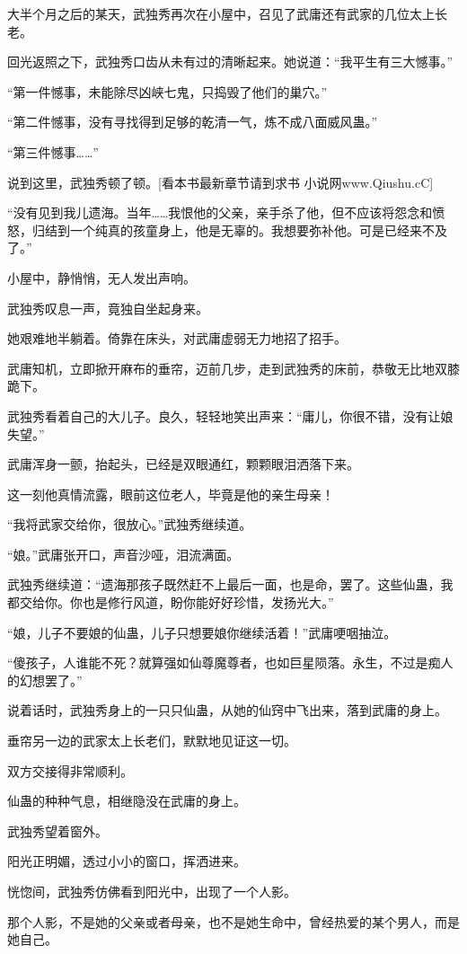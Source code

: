 \begin{this_body}
大半个月之后的某天，武独秀再次在小屋中，召见了武庸还有武家的几位太上长老。

回光返照之下，武独秀口齿从未有过的清晰起来。她说道：“我平生有三大憾事。”

“第一件憾事，未能除尽凶峡七鬼，只捣毁了他们的巢穴。”

“第二件憾事，没有寻找得到足够的乾清一气，炼不成八面威风蛊。”

“第三件憾事……”

说到这里，武独秀顿了顿。[看本书最新章节请到求书 小说网www.Qiushu.cC]

“没有见到我儿遗海。当年……我恨他的父亲，亲手杀了他，但不应该将怨念和愤怒，归结到一个纯真的孩童身上，他是无辜的。我想要弥补他。可是已经来不及了。”

小屋中，静悄悄，无人发出声响。

武独秀叹息一声，竟独自坐起身来。

她艰难地半躺着。倚靠在床头，对武庸虚弱无力地招了招手。

武庸知机，立即掀开麻布的垂帘，迈前几步，走到武独秀的床前，恭敬无比地双膝跪下。

武独秀看着自己的大儿子。良久，轻轻地笑出声来：“庸儿，你很不错，没有让娘失望。”

武庸浑身一颤，抬起头，已经是双眼通红，颗颗眼泪洒落下来。

这一刻他真情流露，眼前这位老人，毕竟是他的亲生母亲！

“我将武家交给你，很放心。”武独秀继续道。

“娘。”武庸张开口，声音沙哑，泪流满面。

武独秀继续道：“遗海那孩子既然赶不上最后一面，也是命，罢了。这些仙蛊，我都交给你。你也是修行风道，盼你能好好珍惜，发扬光大。”

“娘，儿子不要娘的仙蛊，儿子只想要娘你继续活着！”武庸哽咽抽泣。

“傻孩子，人谁能不死？就算强如仙尊魔尊者，也如巨星陨落。永生，不过是痴人的幻想罢了。”

说着话时，武独秀身上的一只只仙蛊，从她的仙窍中飞出来，落到武庸的身上。

垂帘另一边的武家太上长老们，默默地见证这一切。

双方交接得非常顺利。

仙蛊的种种气息，相继隐没在武庸的身上。

武独秀望着窗外。

阳光正明媚，透过小小的窗口，挥洒进来。

恍惚间，武独秀仿佛看到阳光中，出现了一个人影。

那个人影，不是她的父亲或者母亲，也不是她生命中，曾经热爱的某个男人，而是她自己。


\end{this_body}
